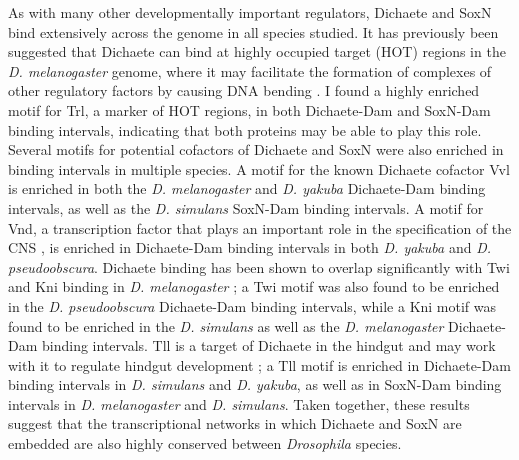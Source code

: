 As with many other developmentally important regulators, Dichaete and SoxN bind extensively across the genome in all species studied. It has previously been suggested that Dichaete can bind at highly occupied target (HOT) regions in the \emph{D. melanogaster} genome, where it may facilitate the formation of complexes of other regulatory factors by causing DNA bending \citep{aleksic_role_2013}. I found a highly enriched motif for Trl, a marker of HOT regions, in both Dichaete-Dam and SoxN-Dam binding intervals, indicating that both proteins may be able to play this role. Several motifs for potential cofactors of Dichaete and SoxN were also enriched in binding intervals in multiple species. A motif for the known Dichaete cofactor Vvl is enriched in both the \emph{D. melanogaster} and \emph{D. yakuba} Dichaete-Dam binding intervals, as well as the \emph{D. simulans} SoxN-Dam binding intervals. A motif for Vnd, a transcription factor that plays an important role in the specification of the CNS \citep{ferrero_soxneuro_2014,zhao_sox-domain_2002}, is enriched in Dichaete-Dam binding intervals in both \emph{D. yakuba} and \emph{D. pseudoobscura}. Dichaete binding has been shown to overlap significantly with Twi and Kni binding in \emph{D. melanogaster} \citep{aleksic_role_2013}; a Twi motif was also found to be enriched in the \emph{D. pseudoobscura} Dichaete-Dam binding intervals, while a Kni motif was found to be enriched in the \emph{D. simulans} as well as the \emph{D. melanogaster} Dichaete-Dam binding intervals. Tll is a target of Dichaete in the hindgut and may work with it to regulate hindgut development \citep{aleksic_role_2013}; a Tll motif is enriched in Dichaete-Dam binding intervals in \emph{D. simulans} and \emph{D. yakuba}, as well as in SoxN-Dam binding intervals in \emph{D. melanogaster} and \emph{D. simulans}. Taken together, these results suggest that the transcriptional networks in which Dichaete and SoxN are embedded are also highly conserved between \emph{Drosophila} species.\\

